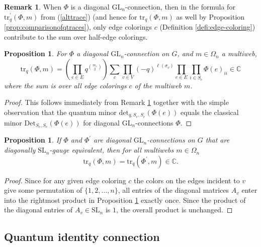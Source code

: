 \documentclass[12pt, reqno]{amsart}
\newtheorem{prop}[theo]{Proposition}
\theoremstyle{definition}
\newtheorem{rema}[theo]{Remark}
\renewcommand{\det}{\mathrm{det}}%
\newcommand{\be}{\begin{equation}}
\newcommand{\ee}{\end{equation}}
\newcommand{\Det}{\mathrm{Det}}%
\newcommand{\trqc}{\mathrm{tr}_q}%
\newcommand{\GL}{\mathrm{GL}}%
\newcommand{\SL}{\mathrm{SL}}%
\begin{document}
\begin{rema}\label{rema:diagonal-connections-and-edge-colorings}
When $\Phi$ is a diagonal $\GL_n$-connection, then in the formula for $\trqc^\prime(\Phi,m)$ from (\ref{alttrace}) (and hence for $\trqc(\Phi,m)$ as well by Proposition \ref{prop:comparisonofqtraces}), only edge colorings $c$ (Definition \ref{defi:edge-coloring}) contribute to the sum over half-edge colorings.
\end{rema}

\begin{prop}\label{prop:tracefordiagconn}
For $\Phi$ a diagonal $\GL_n$-connection on $G$, and $m\in\Omega_n$ a multiweb,
\be \label{eq:formulaoftracefordiagonalconnection}
\trqc(\Phi,m) = \left(\prod_{e\in E}q^{\binom{m_e}{2}}\right)\sum_{c} \prod_{v\in V} (-q)^{\ell(\sigma_v)} \prod_{e\in E}  \prod_{i\in S_e} \Phi(e)_{ii}\in\mathbb{C}
\ee 
where the sum is over all edge colorings $c$ of the multiweb $m$.
\end{prop}

\begin{proof}
This follows immediately from Remark \ref{rema:diagonal-connections-and-edge-colorings} together with the simple observation that the quantum minor $\det_{q,S_e,S_e}(\Phi(e))$ equals the classical minor $\Det_{S_e,S_e}(\Phi(e))$ for diagonal $\GL_n$-connections $\Phi$.
\end{proof}

\begin{prop}\label{coro:diagconjugation}
If $\Phi$ and $\Phi^\prime$ are diagonal $\GL_n$-connections on $G$ that are diagonally $\SL_n$-gauge equivalent, then for all multiwebs $m\in\Omega_n$
$$
\trqc(\Phi,m)=\trqc(\Phi^\prime,m)\in\mathbb{C}.
$$
\end{prop}

\begin{proof}
Since for any given edge coloring $c$ the colors on the edges incident to $v$ give some permutation of $\{1,2,\dots,n\}$, all entries of the diagonal matrices $A_v$ enter into the rightmost product in Proposition \ref{prop:tracefordiagconn} exactly once. Since the product of the diagonal entries of $A_v\in\SL_n$ is $1$, the overall product is unchanged.
\end{proof}

\subsection{Quantum identity connection}\label{ssec:quantumidentityconnection}
\end{document}
